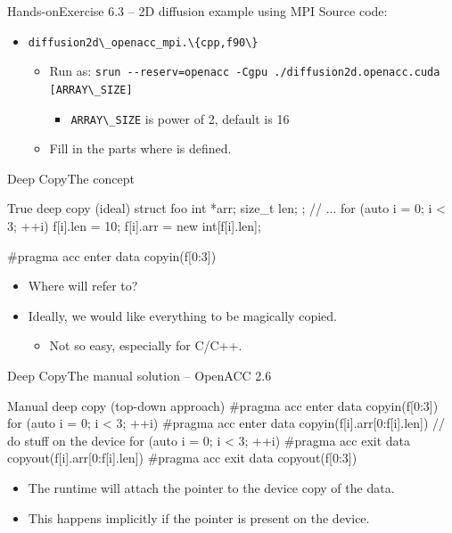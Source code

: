 \documentclass[12pt,aspectratio=169]{beamer}
\newcommand\shinline[2][]{\lstinline[style=shstyle,basicstyle=\ttfamily,#1]!#2!}
\begin{document}
\begin{frame}[fragile]{Hands-on}{Exercise 6.3 -- 2D diffusion example using MPI}
  Source code:
  \begin{itemize}
  \item \shinline{diffusion2d\_openacc_mpi.\{cpp,f90\}}
    \begin{itemize}
      \item Run as: \shinline{srun --reserv=openacc -Cgpu ./diffusion2d.openacc.cuda [ARRAY\_SIZE]}
        \begin{itemize}
        \item \shinline{ARRAY\_SIZE} is power of 2, default is 16
        \end{itemize}
      \item Fill in the parts where  is defined.
    \end{itemize}
  \end{itemize}
\end{frame}

\begin{frame}[fragile]{Deep Copy}{The concept}
  \vspace{.5\baselineskip}
  \begin{Cpplisting}{True deep copy (ideal)}
struct foo {
    int *arr;
    size_t len;
};
// ...
for (auto i = 0; i < 3; ++i) {
    f[i].len = 10;
    f[i].arr = new int[f[i].len];
}

#pragma acc enter data copyin(f[0:3])
  \end{Cpplisting}
  \begin{itemize}
  \item Where will  refer to?
  \item<2-> Ideally, we would like everything to be magically copied.
    \begin{itemize}
    \item Not so easy, especially for C/C++.
    \end{itemize}
  \end{itemize}

\end{frame}

\begin{frame}[fragile]{Deep Copy}{The manual solution -- OpenACC 2.6}
  \begin{Cpplisting}{Manual deep copy (top-down approach)}
#pragma acc enter data copyin(f[0:3])
for (auto i = 0; i < 3; ++i) {
    #pragma acc enter data copyin(f[i].arr[0:f[i].len])
}
// do stuff on the device
for (auto i = 0; i < 3; ++i) {
    #pragma acc exit data copyout(f[i].arr[0:f[i].len])
}
#pragma acc exit data copyout(f[0:3])
  \end{Cpplisting}
  \begin{itemize}
  \item The runtime will attach the  pointer to the device copy of the data.
  \item This happens implicitly if the  pointer is present on the device.
  \end{itemize}
\end{frame}
\end{document}
